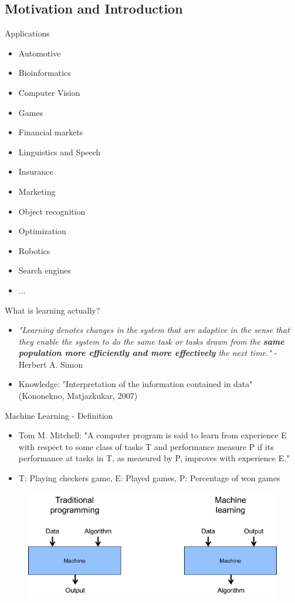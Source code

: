 \documentclass{beamer}
\begin{document}
\subsection{Motivation and Introduction}
	\begin{frame}{Applications}
		\begin{itemize}
			\item Automotive
			\item Bioinformatics
			\item Computer Vision
			\item Games
			\item Financial markets
			\item Linguistics and Speech
			\item Insurance
			\item Marketing
			\item Object recognition
			\item Optimization
			\item Robotics
			\item Search engines
			\item ...
		\end{itemize}
	\end{frame}

	\begin{frame}{What is learning actually?}
		\begin{itemize}
			\item \textit{"Learning denotes changes in the system that are adaptive in the sense that they enable the system to do the same task or tasks drawn from the \textbf{same population more efficiently and more effectively} the next time."} - Herbert A. Simon
			\item Knowledge: "Interpretation of the information contained in data" (Kononekno, Matjazkukar, 2007)
		\end{itemize}
	\end{frame}
	
	\begin{frame}{Machine Learning - Definition}
		\begin{itemize}
			\item Tom M. Mitchell: "A computer program is said to learn from experience E with respect to some class of tasks T and performance measure P if its performance at tasks in T, as measured by P, improves with experience E."
			\item T: Playing checkers game, E: Played games, P: Percentage of won games
		\end{itemize}
        \begin{figure}
        \includegraphics[width = 0.7\linewidth]{figures/introduction/MachineLearningTalend2}
        \end{figure}
        
        
	\end{frame}
\end{document}
